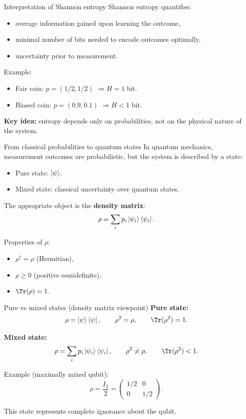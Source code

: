 \documentclass[aspectratio=169]{beamer}
\begin{document}
\begin{frame}{Interpretation of Shannon entropy}
Shannon entropy quantifies:
\begin{itemize}
\item average information gained upon learning the outcome,
\item minimal number of bits needed to encode outcomes optimally,
\item uncertainty prior to measurement.
\end{itemize}

\medskip
Example:
\begin{itemize}
\item Fair coin: $p=(1/2,1/2)$ $\Rightarrow H=1$ bit.
\item Biased coin: $p=(0.9,0.1)$ $\Rightarrow H<1$ bit.
\end{itemize}

\medskip
\textbf{Key idea:} entropy depends only on probabilities, not on the
physical nature of the system.
\end{frame}

\begin{frame}{From classical probabilities to quantum states}
In quantum mechanics, measurement outcomes are probabilistic, but
the system is described by a state:

\medskip
\begin{itemize}
\item Pure state: $\ket{\psi}$.
\item Mixed state: classical uncertainty over quantum states.
\end{itemize}

\medskip
The appropriate object is the \textbf{density matrix}:
\[
\rho = \sum_i p_i \ket{\psi_i}\bra{\psi_i}.
\]

\medskip
Properties of $\rho$:
\begin{itemize}
\item $\rho^\dagger = \rho$ (Hermitian),
\item $\rho \ge 0$ (positive semidefinite),
\item $\Tr(\rho)=1$.
\end{itemize}
\end{frame}

\begin{frame}{Pure vs mixed states (density matrix viewpoint)}
\textbf{Pure state:}
\[
\rho = \ket{\psi}\bra{\psi}, \qquad \rho^2 = \rho, \qquad \Tr(\rho^2)=1.
\]

\medskip
\textbf{Mixed state:}
\[
\rho = \sum_i p_i \ket{\psi_i}\bra{\psi_i}, \qquad \rho^2 \neq \rho,
\qquad \Tr(\rho^2)<1.
\]

\medskip
Example (maximally mixed qubit):
\[
\rho = \frac{I_2}{2}
= \begin{pmatrix}
1/2 & 0\\
0 & 1/2
\end{pmatrix}.
\]

\medskip
This state represents complete ignorance about the qubit.
\end{frame}
\end{document}
